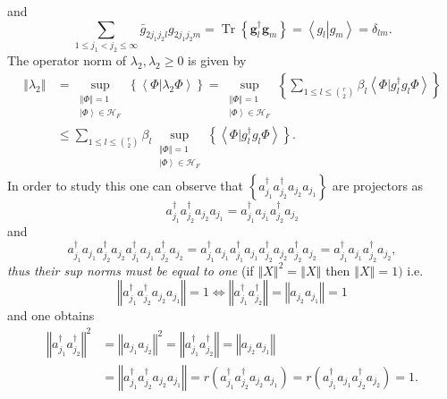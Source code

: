 \documentclass[aps,preprint]{revtex4}%
\begin{document}
and
\begin{equation}
\sum_{1\leq j_{1}<j_{2}\leq\infty}\bar{g}_{2j_{1}j_{2}l}g_{2j_{1}j_{2}%
m}=\operatorname*{Tr}\left\{  \mathbf{g}_{l}^{\dagger}\mathbf{g}_{m}\right\}
=\left\langle g_{l}\left\vert g_{m}\right.  \right\rangle =\delta_{lm}.
\end{equation}
The operator norm of $\lambda_{2},\lambda_{2}\geq0$ is given by
\begin{align}
\left\Vert \lambda_{2}\right\Vert  &  =\sup_{\substack{\left\Vert
\Phi\right\Vert =1\\\left\vert \Phi\right\rangle \in\mathcal{H}_{F}}}\left\{
\left\langle \left.  \Phi\right\vert \lambda_{2}\Phi\right\rangle \right\}
=\sup_{\substack{\left\Vert \Phi\right\Vert =1\\\left\vert \Phi\right\rangle
\in\mathcal{H}_{F}}}\left\{  \sum_{1\leq l\leq\binom{r}{2}}\beta
_{l}\left\langle \left.  \Phi\right\vert g_{l}^{\dagger}g_{l}\Phi\right\rangle
\right\} \\
&  \leq\sum_{1\leq l\leq\binom{r}{2}}\beta_{l}\sup_{\substack{\left\Vert
\Phi\right\Vert =1\\\left\vert \Phi\right\rangle \in\mathcal{H}_{F}}}\left\{
\left\langle \left.  \Phi\right\vert g_{l}^{\dagger}g_{l}\Phi\right\rangle
\right\}  .
\end{align}
In order to study this one can observe that $\left\{  a_{j_{1}}^{\dagger
}a_{j_{2}}^{\dagger}a_{j_{2}}a_{j_{1}}\right\}  $ are projectors as
\begin{equation}
a_{j_{1}}^{\dagger}a_{j_{2}}^{\dagger}a_{j_{2}}a_{j_{1}}=a_{j_{1}}^{\dagger
}a_{j_{1}}a_{j_{2}}^{\dagger}a_{j_{2}}%
\end{equation}
and
\begin{equation}
a_{j_{1}}^{\dagger}a_{j_{1}}a_{j_{2}}^{\dagger}a_{j_{2}}a_{j_{1}}^{\dagger
}a_{j_{1}}a_{j_{2}}^{\dagger}a_{j_{2}}=a_{j_{1}}^{\dagger}a_{j_{1}}a_{j_{1}%
}^{\dagger}a_{j_{1}}a_{j_{2}}^{\dagger}a_{j_{2}}a_{j_{2}}^{\dagger}a_{j_{2}%
}=a_{j_{1}}^{\dagger}a_{j_{1}}a_{j_{2}}^{\dagger}a_{j_{2}},
\end{equation}
\emph{thus their sup norms must be equal to one }(if $\left\Vert X\right\Vert
^{2}=\left\Vert X\right\Vert $ then $\left\Vert X\right\Vert =1)$ i.e.
\begin{equation}
\left\Vert a_{j_{1}}^{\dagger}a_{j_{2}}^{\dagger}a_{j_{2}}a_{j_{1}}\right\Vert
=1\Leftrightarrow\left\Vert a_{j_{1}}^{\dagger}a_{j_{2}}^{\dagger}\right\Vert
=\left\Vert a_{j_{2}}a_{j_{1}}\right\Vert =1
\end{equation}
and one obtains%
\begin{align}
\left\Vert a_{j_{1}}^{\dagger}a_{j_{2}}^{\dagger}\right\Vert ^{2}  &
=\left\Vert a_{j_{1}}a_{j_{2}}\right\Vert ^{2}=\left\Vert a_{j_{1}}^{\dagger
}a_{j_{2}}^{\dagger}\right\Vert =\left\Vert a_{j_{2}}a_{j_{1}}\right\Vert
\nonumber\\
&  =\left\Vert a_{j_{1}}^{\dagger}a_{j_{2}}^{\dagger}a_{j_{2}}a_{j_{1}%
}\right\Vert =r\left(  a_{j_{1}}^{\dagger}a_{j_{2}}^{\dagger}a_{j_{2}}%
a_{j_{1}}\right)  =r\left(  a_{j_{1}}^{\dagger}a_{j_{1}}a_{j_{2}}^{\dagger
}a_{j_{2}}\right)  =1.
\end{align}
\end{document}
